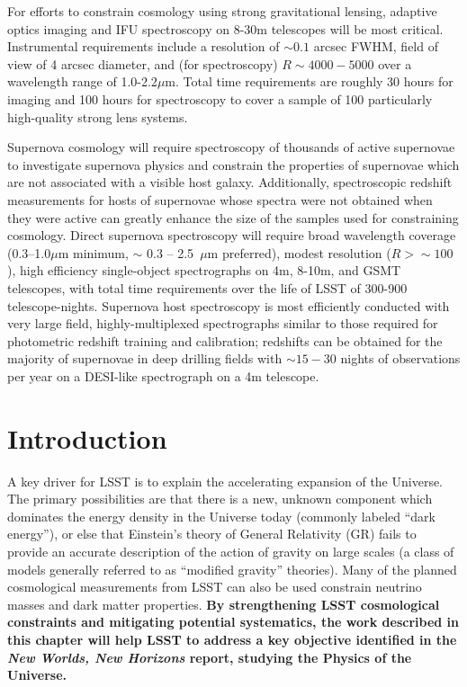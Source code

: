 \documentclass[12pt]{report}
\begin{document}
For efforts to constrain cosmology using strong gravitational lensing, adaptive optics imaging and IFU spectroscopy on 8-30m telescopes will be most critical.  Instrumental requirements include a resolution of $\sim 0.1$ arcsec FWHM, field of view of 4 arcsec diameter, and (for spectroscopy) $R \sim 4000 - 5000$ over a wavelength range of 1.0-2.2$\mu$m.   Total time requirements are roughly 30 hours for imaging and 100 hours for spectroscopy to cover a sample of 100 particularly high-quality strong lens systems.

Supernova cosmology will require spectroscopy of thousands of active supernovae to investigate supernova physics and constrain the properties of supernovae which are not associated with a visible host galaxy.  Additionally, spectroscopic redshift measurements for hosts of supernovae whose spectra were not obtained when they were active can greatly enhance the size of the samples used for constraining cosmology.  Direct supernova spectroscopy will require broad wavelength coverage (0.3--1.0$\mu$m minimum, $\sim$ 0.3 -- 2.5~$\mu$m preferred), modest resolution ($R>\sim 100$), high efficiency single-object spectrographs on 4m, 8-10m, and GSMT telescopes, with total time requirements over the life of LSST of 300-900 telescope-nights.  Supernova host spectroscopy is most efficiently conducted with very large field, highly-multiplexed spectrographs similar to those required for photometric redshift training and calibration; redshifts can be obtained for the majority of supernovae in deep drilling fields with $\sim 15-30$ nights of observations per year on a DESI-like spectrograph on a 4m telescope.

\section{Introduction}

A key driver for LSST is to explain the accelerating expansion of the Universe.  The primary possibilities are that there is a new, unknown component which dominates the energy density in the Universe today (commonly labeled ``dark energy''), or else that Einstein's theory of General Relativity (GR) fails to provide an accurate description of the action of gravity on large scales (a class of models generally referred to as ``modified gravity'' theories).  Many of the planned cosmological measurements from LSST can also be used constrain neutrino masses and dark matter properties.  {\bf By strengthening LSST cosmological constraints and mitigating potential systematics, the work described in this chapter will help LSST to address a key objective identified in the {\it New Worlds, New Horizons} report, studying the Physics of the Universe.}
\end{document}
